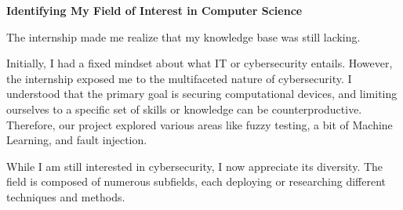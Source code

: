 \textbf{Identifying My Field of Interest in Computer Science}

The internship made me realize that my knowledge base was still lacking.

Initially, I had a fixed mindset about what IT or cybersecurity entails.
However, the internship exposed me to the multifaceted nature of cybersecurity.
I understood that the primary goal is securing computational devices, and
limiting ourselves to a specific set of skills or knowledge can be
counterproductive. Therefore, our project explored various areas like fuzzy
testing, a bit of Machine Learning, and fault injection.

While I am still interested in cybersecurity, I now appreciate its diversity.
The field is composed of numerous subfields, each deploying or researching
different techniques and methods.
